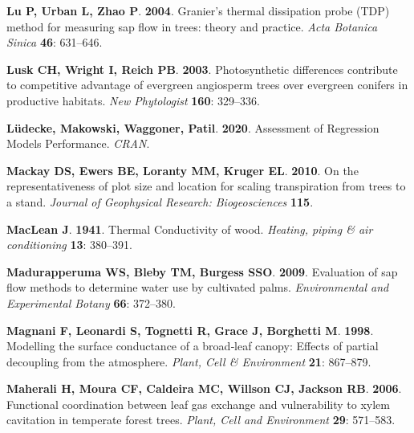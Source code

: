 \documentclass[11pt,twoside]{reedthesis}
\begin{document}
\hypertarget{ref-Lu2004}{}
\textbf{\textnormal{Lu P}, \textnormal{Urban L}, \textnormal{Zhao P}}.
\textbf{2004}. Granier's thermal dissipation probe (TDP) method for
measuring sap flow in trees: theory and practice. \emph{Acta Botanica
Sinica} \textbf{46}: 631--646.

\hypertarget{ref-lusk_photosynthetic_2003}{}
\textbf{\textnormal{Lusk CH}, \textnormal{Wright I}, \textnormal{Reich
PB}}. \textbf{2003}. Photosynthetic differences contribute to
competitive advantage of evergreen angiosperm trees over evergreen
conifers in productive habitats. \emph{New Phytologist} \textbf{160}:
329--336.

\hypertarget{ref-ludecke_assessment_2020}{}
\textbf{\textnormal{Lüdecke}, \textnormal{Makowski},
\textnormal{Waggoner}, \textnormal{Patil}}. \textbf{2020}. Assessment of
Regression Models Performance. \emph{CRAN}.

\hypertarget{ref-Mackay2010}{}
\textbf{\textnormal{Mackay DS}, \textnormal{Ewers BE},
\textnormal{Loranty MM}, \textnormal{Kruger EL}}. \textbf{2010}. On the
representativeness of plot size and location for scaling transpiration
from trees to a stand. \emph{Journal of Geophysical Research:
Biogeosciences} \textbf{115}.

\hypertarget{ref-MacLean1941}{}
\textbf{\textnormal{MacLean J}}. \textbf{1941}. Thermal Conductivity of
wood. \emph{Heating, piping \& air conditioning} \textbf{13}: 380--391.

\hypertarget{ref-Madurapperuma2009}{}
\textbf{\textnormal{Madurapperuma WS}, \textnormal{Bleby TM},
\textnormal{Burgess SSO}}. \textbf{2009}. Evaluation of sap flow methods
to determine water use by cultivated palms. \emph{Environmental and
Experimental Botany} \textbf{66}: 372--380.

\hypertarget{ref-magnani_modelling_1998}{}
\textbf{\textnormal{Magnani F}, \textnormal{Leonardi S},
\textnormal{Tognetti R}, \textnormal{Grace J}, \textnormal{Borghetti
M}}. \textbf{1998}. Modelling the surface conductance of a broad‐leaf
canopy: Effects of partial decoupling from the atmosphere. \emph{Plant,
Cell \& Environment} \textbf{21}: 867--879.

\hypertarget{ref-maherali_functional_2006}{}
\textbf{\textnormal{Maherali H}, \textnormal{Moura CF},
\textnormal{Caldeira MC}, \textnormal{Willson CJ}, \textnormal{Jackson
RB}}. \textbf{2006}. Functional coordination between leaf gas exchange
and vulnerability to xylem cavitation in temperate forest trees.
\emph{Plant, Cell and Environment} \textbf{29}: 571--583.
\end{document}
